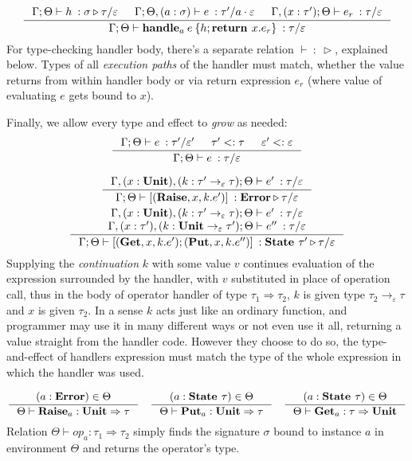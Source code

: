 \documentclass[declaration,shortabstract]{iithesis}
\theoremstyle{definition} \newtheorem{definition}{Definition}[section]
\newcommand{\types}[4][\Gamma;\Theta]{\ensuremath{{{#1} \vdash {#2} \: : {#3}/{#4}}}}
\newcommand{\arrow}[3]{{#1}\rightarrow_{#2}{#3}}
\newcommand{\optypes}[5][\Theta]{\ensuremath{{#1}\vdash{#2}_{#3} : {#4} \Rightarrow {#5}}}
\begin{document}
$$
 \inference{
    \types{h}{\sigma \triangleright \tau}{\varepsilon} &
    \types[\Gamma;\Theta,(a:\sigma)]{e}{\tau'}{a \cdot \varepsilon} &
    \types[\Gamma,(x:\tau');\Theta]{e_r}{\tau}{\varepsilon}
}{
    \types{\textbf{handle}_a \: e\: \{h;\textbf{return } x. e_r\}}{\tau}{\varepsilon}
}
$$
For type-checking handler body, there's a separate relation $\vdash \ : \ \triangleright$, explained below.
Types of all \textit{execution paths} of the handler must match,
whether the value returns from within handler body
or via return expression $e_r$ (where value of evaluating $e$ gets bound to $x$).

Finally, we allow every type and effect to \textit{grow} as needed:
$$
\inference{
    \types{e}{\tau'}{\varepsilon'} & \tau' <: \tau & \varepsilon' <: \varepsilon
}{
    \types{e}{\tau}{\varepsilon}
}
$$

\begin{gather*}
\begin{gathered}
\inference{
    \types[\Gamma,(x:\textbf{Unit}), (k:\arrow{\tau'}{\varepsilon}{\tau});\Theta]{e'}{\tau}{\varepsilon}
}{ 
    \types{ [(\textbf{Raise}, x, k. e')]}{\textbf{Error}\triangleright \tau}{\varepsilon}
}
\\
\inference{
\types[\Gamma,(x:\textbf{Unit}), (k:\arrow{\tau'}{\varepsilon}{\tau});\Theta]{e'}{\tau}{\varepsilon} \\
\types[\Gamma,(x:\tau'),(k:\arrow{\textbf{Unit}}{\varepsilon}{\tau'});\Theta]{e''}{\tau}{\varepsilon} 
}{
\types{ [(\textbf{Get}, x, k. e');(\textbf{Put}, x, k. e'')]}{\textbf{State }\tau'\triangleright \tau}{\varepsilon} 
}
\end{gathered}
\end{gather*}
Supplying the \textit{continuation} $k$ with some value $v$ continues evaluation of
the expression surrounded by the handler,
with $v$ substituted in place of operation call,
thus in the body of operator handler of type $\tau_1\Rightarrow\tau_2$, $k$ is given type
$\arrow{\tau_2}{\varepsilon}{\tau}$ and $x$ is given $\tau_2$.
In a sense $k$ acts just like an ordinary function, and programmer may use it
in many different ways or not even use it all, returning a value straight from the handler code.
However they choose to do so, the type-and-effect of handlers expression must match the type
of the whole expression in which the handler was used.

\begin{gather*}
\begin{gathered}
\inference{
    (a : \textbf{Error}) \in \Theta
}{
    \optypes{\textbf{Raise}}{a}{\textbf{Unit}}{\tau}
}
\quad 
\inference{
    (a : \textbf{State }\tau) \in \Theta
}{
    \optypes{\textbf{Put}}{a}{\textbf{Unit}}{\tau}
}
\quad 
\inference{
    (a : \textbf{State }\tau) \in \Theta
}{
    \optypes{\textbf{Get}}{a}{\tau}{\textbf{Unit}}
}
\end{gathered}
\end{gather*}
Relation $\optypes{op}{a}{\tau_1}{\tau_2}$ simply finds the signature
$\sigma$ bound to instance $a$ in environment $\Theta$ and returns the operator's type.    
\end{document}
